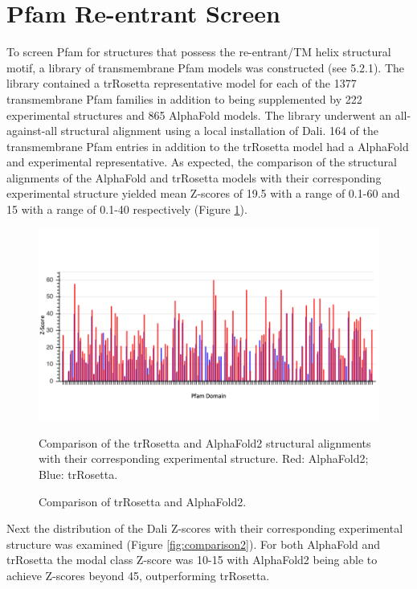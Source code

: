 \section{Pfam Re-entrant Screen}
To screen Pfam for structures that possess the re-entrant/TM helix structural motif, a library of transmembrane Pfam models was constructed (see 5.2.1).  The library contained a trRosetta representative model for each of the 1377 transmembrane Pfam families in addition to being supplemented by 222 experimental structures and 865 AlphaFold models.  The library underwent an all-against-all structural alignment using a local installation of Dali.  164 of the transmembrane Pfam entries in addition to the trRosetta model had a AlphaFold and experimental representative.  As expected, the comparison of the structural alignments of the AlphaFold and trRosetta models with their corresponding experimental structure yielded mean Z-scores of 19.5 with a range of 0.1-60 and 15 with a range of 0.1-40 respectively (Figure \ref{fig:comparison1}). 

\begin{figure}[th!]
    \centering
    \includegraphics[width=150mm, scale=0.75]{Pfam/tr_af_comp.png}
    \caption{Comparison of trRosetta and AlphaFold2.}
    \label{fig:comparison1}
    \small
    \begin{flushleft}Comparison of the trRosetta and AlphaFold2 structural alignments with their corresponding experimental structure. Red: AlphaFold2; Blue:  trRosetta.\end{flushleft}
\end{figure}

Next the distribution of the Dali Z-scores with their corresponding experimental structure was examined (Figure \ref{fig:comparison2}). For both AlphaFold and trRosetta the modal class Z-score was 10-15 with AlphaFold2 being able to achieve Z-scores beyond 45, outperforming trRosetta.

